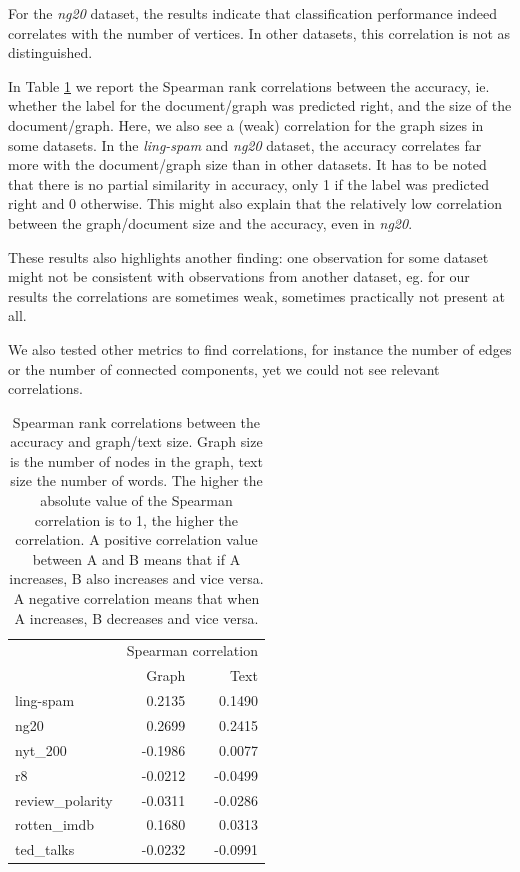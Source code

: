 For the \textit{ng20} dataset, the results indicate that classification performance indeed correlates with the number of vertices.
In other datasets, this correlation is not as distinguished.
\fi

In Table \ref{table:correlations_size} we report the Spearman rank correlations \cite{Hauke2011} between the accuracy, ie. whether the label for the document/graph was predicted right, and the size of the document/graph.
Here, we also see a (weak) correlation for the graph sizes in some datasets.
In the \textit{ling-spam} and \textit{ng20} dataset, the accuracy correlates far more with the document/graph size than in other datasets.
It has to be noted that there is no partial similarity in accuracy, only 1 if the label was predicted right and 0 otherwise.
This might also explain that the relatively low correlation between the graph/document size and the accuracy, even in \textit{ng20}.

These results also highlights another finding: one observation for some dataset might not be consistent with observations from another dataset, eg. for our results the correlations are sometimes weak, sometimes practically not present at all.

We also tested other metrics to find correlations, for instance the number of edges or the number of connected components, yet we could not see relevant correlations.

\begin{table}[htb!]
	\centering
	\begin{tabular}{lrr}
		&  \multicolumn{2}{c}{Spearman correlation} \\
		&  Graph &  Text \\
		\midrule
		ling-spam       &  0.2135 &  0.1490 \\
		ng20            &  0.2699 &  0.2415 \\
		nyt\_200         & -0.1986 &  0.0077 \\
		r8              & -0.0212 & -0.0499 \\
		review\_polarity & -0.0311 & -0.0286 \\
		rotten\_imdb     &  0.1680 &  0.0313 \\
		ted\_talks       & -0.0232 & -0.0991 \\
		\bottomrule
	\end{tabular}
	\caption[Table: Graph/text size correlations]{Spearman rank correlations between the accuracy and graph/text size. Graph size is the number of nodes in the graph, text size the number of words. The higher the absolute value of the Spearman correlation is to 1, the higher the correlation.
	A positive correlation value between A and B means that if A increases, B also increases and vice versa.
	A negative correlation means that when A increases, B decreases and vice versa.}%
	\label{table:correlations_size}
\end{table}

